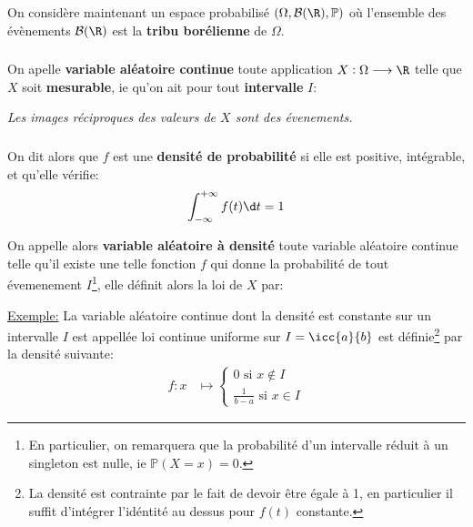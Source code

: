 \chapter*{} %

On considère maintenant un espace probabilisé \((\Omega, \mathcal{B}(\R), \mathbb{P})\) où l'ensemble des évènements \(\mathcal{B}(\R)\) est la \textbf{tribu borélienne} de \(\Omega\).

\subsection*{}
On apelle \textbf{variable aléatoire continue} toute application \(X: \Omega \longrightarrow \R\) telle que \(X\) soit \textbf{mesurable}, ie qu'on ait pour tout \textbf{intervalle} \(I\):

\begin{center}
   \textit{Les images réciproques des valeurs de \(X\) sont des évenements.}
\end{center}

\subsection*{}
On dit alors que \(f\) est une \textbf{densité de probabilité} si elle est positive, intégrable, et qu'elle vérifie:
\[
   \int_{-\infty}^{+\infty} f(t) \d t = 1
\]


On appelle alors \textbf{variable aléatoire à densité} toute variable aléatoire continue telle qu'il existe une telle fonction \(f\) qui donne la probabilité de tout évemenement \(I\)\footnote[1]{En particulier, on remarquera que la probabilité d'un intervalle réduit à un singleton est nulle, ie \(\mathbb{P}(X = x) = 0\).}, elle définit alors la loi de \(X\) par:

\underline{Exemple:} La variable aléatoire continue dont la densité est constante sur
un intervalle \(I\)  est appellée loi continue uniforme sur \(I = \icc{a}{b}\) est définie\footnote[2]{La densité est contrainte par le fait de devoir être égale à 1, en particulier il suffit d'intégrer l'idéntité au dessus pour \(f(t)\) constante.} par la densité suivante:
\[
   \begin{aligned}
      f: x &\longmapsto \begin{cases}
         0 \text{ si } x  \notin I\\
         \frac{1}{b - a} \text{ si } x \in I
      \end{cases}
   \end{aligned}
\]

